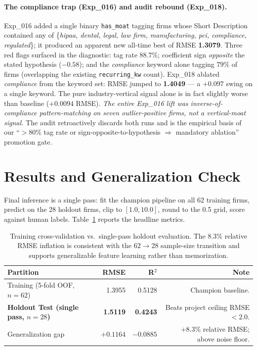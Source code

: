 \documentclass{article}
\begin{document}
\paragraph{The compliance trap (Exp\_016) and audit rebound (Exp\_018).}
Exp\_016 added a single binary \texttt{has\_moat} tagging firms whose Short Description
contained any of \{\emph{hipaa, dental, legal, law firm, manufacturing, pci, compliance,
regulated}\}; it produced an apparent new all-time best of RMSE \textbf{1.3079}. Three
red flags surfaced in the diagnostic: tag rate $88.7\%$; coefficient sign \emph{opposite}
the stated hypothesis ($-0.58$); and the \emph{compliance} keyword alone tagging $79\%$ of
firms (overlapping the existing \texttt{recurring\_kw} count). Exp\_018 ablated
\emph{compliance} from the keyword set: RMSE jumped to \textbf{1.4049} --- a $+0.097$
swing on a single keyword. The pure industry-vertical signal alone is in fact slightly
worse than baseline ($+0.0094$ RMSE). \emph{The entire Exp\_016 lift was
inverse-of-compliance pattern-matching on seven outlier-positive firms, not a
vertical-moat signal.} The audit retroactively discards both runs and is the empirical
basis of our ``$>80\%$ tag rate or sign-opposite-to-hypothesis $\Rightarrow$ mandatory
ablation'' promotion gate.

\section{Results and Generalization Check}
\label{sec:results}
Final inference is a single pass: fit the champion pipeline on all 62 training firms,
predict on the 28 holdout firms, clip to $[1.0, 10.0]$, round to the 0.5 grid, score
against human labels. Table~\ref{tab:results} reports the headline metrics.

\begin{table}[h]
  \caption{Training cross-validation vs.\ single-pass holdout evaluation. The 8.3\%
  relative RMSE inflation is consistent with the $62 \to 28$ sample-size transition and
  supports generalizable feature learning rather than memorization.}
  \label{tab:results}
  \centering\small
  \begin{tabular}{@{}lrrr@{}}
    \toprule
    \textbf{Partition} & \textbf{RMSE} & \textbf{R$^2$} & \textbf{Note} \\
    \midrule
    Training (5-fold OOF, $n{=}62$)               & 1.3955 & 0.5128 & Champion baseline. \\
    \textbf{Holdout Test (single pass, $n{=}28$)} & \textbf{1.5119} & \textbf{0.4243} & Beats project ceiling RMSE${<}2.0$. \\
    \midrule
    Generalization gap                            & $+0.1164$ & $-0.0885$ & $+8.3\%$ relative RMSE; above noise floor. \\
    \bottomrule
  \end{tabular}
\end{table}
\end{document}
